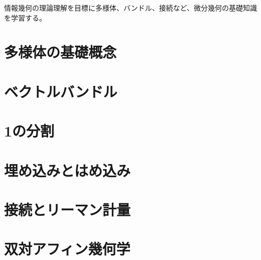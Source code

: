 \documentclass{ujarticle}
\begin{document}
情報幾何の理論理解を目標に多様体、バンドル、接続など、微分幾何の基礎知識を学習する。

\section{多様体の基礎概念}
\label{sec:多様体の基礎概念}

\section{ベクトルバンドル}
\label{sec:ベクトルバンドル}

\section{1の分割}
\label{sec:1の分割}

\section{埋め込みとはめ込み}
\label{sec:埋め込みとはめ込み}


\section{接続とリーマン計量}
\label{sec:接続とリーマン計量}

\section{双対アフィン幾何学}
\label{sec:双対アフィン幾何学}
\end{document}
